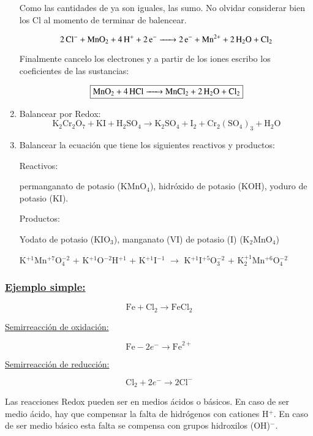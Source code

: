 \begin{enumerate}
Como las cantidades de  ya son iguales, las sumo. No olvidar considerar bien los Cl al momento de terminar de balencear.

$$\ce{2 Cl^- + MnO_2 + 4H^+ + 2e^- -> 2e^- + Mn^{2+} + 2H_2O + Cl_2}$$

Finalmente cancelo los electrones y a partir de los iones escribo los coeficientes de las sustancias:

$$\fbox{\ce{MnO_2 + 4HCl -> MnCl_2 + 2H_2O + Cl_2}}$$


\item Balancear por Redox:
$$\text{K}_2\text{Cr}_2\text{O}_7 + \text{KI} + \text{H}_2\text{SO}_4 \longrightarrow \text{K}_2\text{SO}_4 + \text{I}_2 + \text{Cr}_2(\text{SO}_4)_3 + \text{H}_2\text{O}$$


\item 
Balancear la ecuación que tiene los siguientes reactivos y productos:

Reactivos:

permanganato de potasio (KMnO$_4$), hidróxido de potasio (KOH), yoduro de potasio (KI).

\skipline
Productos:

Yodato de potasio (KIO$_3$), manganato (VI) de potasio (I) (K$_2$MnO$_4$)

\skipline
{\large
\hfil
K$^{+1}$Mn$^{+7}$O$_4^{-2}$ \hfil+\hfil
K$^{+1}$O$^{-2}$H$^{+1}$ \hfil+\hfil
K$^{+1}$I$^{-1}$ \hfil$\longrightarrow$\hfil
K$^{+1}$I$^{+5}$O$_3^{-2}$ \hfil+\hfil
K$_2^{+1}$Mn$^{+6}$O$_4^{-2}$
\hfil
}
\end{enumerate}


\subsubsection*{\underline{Ejemplo simple:}}

$$\text{Fe} + \text{Cl}_2 \longrightarrow \text{FeCl}_2$$

\begin{multicols}{2}

\underline{Semirreacción de oxidación:}

$$\text{Fe} - 2e^- \longrightarrow \text{Fe}^{2+}$$

\underline{Semirreacción de reducción:}

$$\text{Cl}_2 + 2e^- \longrightarrow 2\text{Cl}^{-} $$

\end{multicols}

Las reacciones Redox pueden ser en medios ácidos o básicos. En caso de ser medio ácido, hay que compensar la falta de hidrógenos con cationes H$^+$. En caso de ser medio básico esta falta se compensa con grupos hidroxilos (OH)$^-$.


